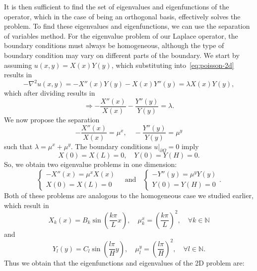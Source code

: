 It is then sufficient to find the set of eigenvalues and eigenfunctions of the operator, which in the case of being an orthogonal basis, effectively solves the problem. To find these eigenvalues and eigenfunctions, we can use the separation of variables method. For the eigenvalue problem of our Laplace operator, the boundary conditions must always be homogeneous, although the type of boundary condition may vary on different parts of the boundary. We start by assuming $u(x,y)=X(x)Y(y)$, which substituting into~\eqref{eq:poisson-2d} results in
\begin{equation}
    -\nabla^{2}u(x,y)=-X''(x)Y(y)-X(x)Y''(y)=\lambda X(x)Y(y),
\end{equation}
which after dividing results in
\begin{equation}
    \Rightarrow-\frac{X''(x)}{X(x)}-\frac{Y''(y)}{Y(y)}=\lambda.
\end{equation}
We now propose the separation
\begin{equation}
    -\frac{X''(x)}{X(x)} = \mu^x, \quad -\frac{Y''(y)}{Y(y)} = \mu^y
\end{equation}
such that $\lambda = \mu^x + \mu^y$.  The boundary conditions $u|_{\partial\Omega}=0$ imply
\begin{equation}
    X(0)=X(L)=0, \quad Y(0)=Y(H)=0.
\end{equation}
So, we obtain two eigenvalue problems in one dimension: 
\begin{equation}
    \begin{cases}-X''(x)=\mu^{x}X(x)\\ X(0)=X(L)=0\end{cases} \quad \text{and} \quad \begin{cases}-Y''(y)=\mu^{y}Y(y)\\ Y(0)=Y(H)=0\end{cases}.
\end{equation}
Both of these problems are analogous to the homogeneous case we studied earlier, which result in
\begin{equation}
    X_{k}(x)=B_{k}\sin\left(\frac{k\pi}{L}x\right), \quad \mu_{k}^{x}=\left(\frac{k\pi}{L}\right)^{2}, \quad \forall k\in\mathbb{N}
\end{equation}
and
\begin{equation}
    Y_{l}(y)=C_{l}\sin\left(\frac{l\pi}{H}y\right), \quad \mu_{l}^{y}=\left(\frac{l\pi}{H}\right)^{2}, \quad \forall l\in\mathbb{N}.
\end{equation}
Thus we obtain that the eigenfunctions and eigenvalues of the 2D problem are:
